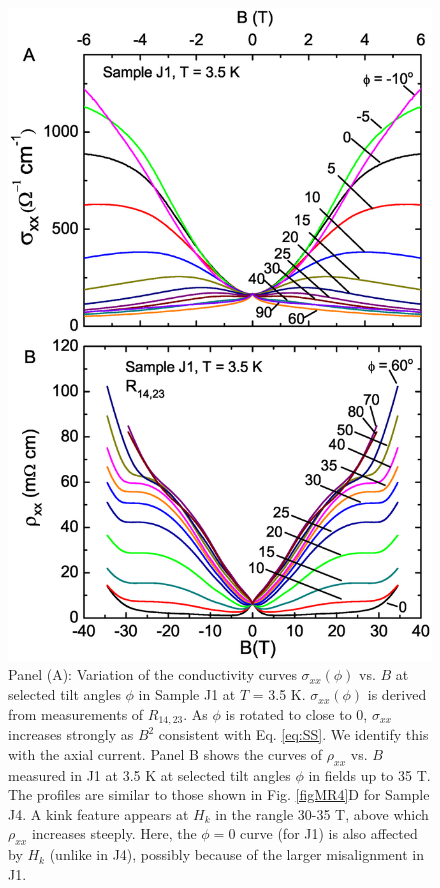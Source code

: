 \begin{figure}[!htbp]
  \begin{center}
\includegraphics[width=0.8\linewidth]{ch-na3bi/figures/FigJ1CondMR.eps}
\caption{\label{J1MR} Panel (A): Variation of the conductivity curves $\sigma_{xx}(\phi)$ vs. $B$ at selected tilt angles $\phi$ in Sample J1 at $T$ = 3.5 K. 
$\sigma_{xx}(\phi)$ is derived from measurements of $R_{14,23}$. As $\phi$ is rotated to close to 0, $\sigma_{xx}$ increases strongly as $B^2$ consistent with Eq. \ref{eq:SS}. We identify this with the axial current. 
Panel B shows the curves of $\rho_{xx}$ vs. $B$ measured in J1 at 3.5 K at selected tilt angles $\phi$ in fields up to 35 T. The profiles are similar to those shown in Fig. \ref{figMR4}D for Sample J4. A kink feature appears at $H_k$ in the rangle 30-35 T, above which $\rho_{xx}$ increases steeply. Here, the $\phi = 0$ curve (for J1) is also affected by $H_k$ (unlike in J4), possibly because of the larger misalignment in J1.
}
  \end{center}
\end{figure}

